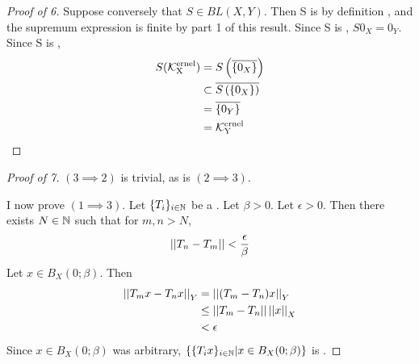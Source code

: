 \begin{prop}
\begin{proof}[Proof of 6]
    Suppose conversely that $S \in BL(X,Y)$. 
    Then S is 
	\Linear 
	by definition
    , and the supremum expression is finite by part 1 
    of this result. 
    Since S is 
	\Linear, $S0_X = 0_Y$. 
    Since S is 
	\ContinuousFunction, 
    \begin{align*}
        S(\bf\mathcal{K}\rm^{ernel}_X) &= S\left( \overline{\{0_X\}}\right)\\
        & \subset \overline{S\left( \{0_X\}\right)}\\
        & =\overline{\{0_Y\}} \\
        & = \bf\mathcal{K}\rm^{ernel}_Y
    \end{align*}



\end{proof}
\begin{proof}[Proof of 7]
    $(3 \implies 2)$ is trivial, as is $(2 \implies 3)$.
    
    I now prove $(1\implies 3)$. 
    Let $\{T_i\}_{i \in \mathbb{N}}$ be a 
    \PseudometricCauchySequence.
    Let $\beta > 0$. 
    Let $\epsilon > 0$. 
    Then there exists $N \in \mathbb{N}$
    such that for $m,n > N$, 
    \begin{equation*}
    \left|\left| T_n-T_m \right|\right| < \frac{\epsilon}{\beta}
    \end{equation*}
    Let $x \in B_X(0;\beta)$. 
    Then 
    \begin{align*}
        \left|\left| T_mx-T_nx \right|\right|_Y & = \left|\left| (T_m-T_n)x \right|\right|_Y\\
        & \leq \left|\left| T_m-T_n \right|\right| \left|\left| x \right|\right|_X\\
        & < \epsilon
    \end{align*}
    Since $x \in B_X(0;\beta)$ was arbitrary,
    $\{\{T_ix\}_{i \in \mathbb{N}} | x \in B_X(0;\beta)\}$ is
    \UniformlyCauchy.


\end{proof}
\end{prop}
